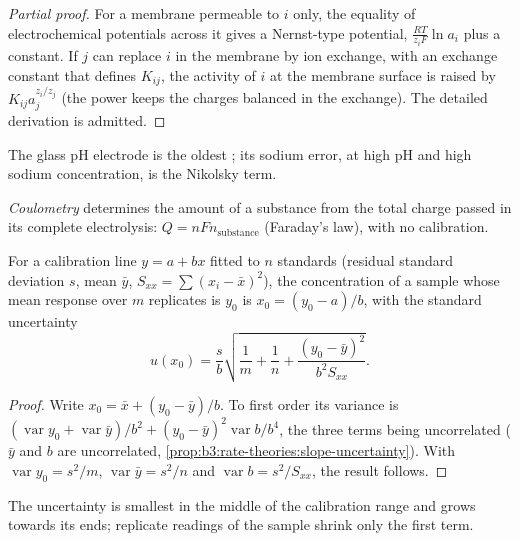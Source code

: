 \begin{proof}[Partial proof]
For a membrane permeable to $i$ only, the equality of electrochemical
potentials across it gives a Nernst-type potential, $\frac{RT}{z_iF}\ln a_i$ plus a constant.
If $j$ can replace $i$ in the membrane by ion exchange, with an exchange
constant that defines $K_{ij}$, the activity of $i$ at the membrane surface is raised by
$K_{ij}a_j^{z_i/z_j}$ (the power keeps the charges balanced in the exchange). The detailed
derivation is admitted.
\end{proof}

The glass pH electrode is the oldest ; its sodium
error, at high pH and high sodium concentration, is the Nikolsky term.

\begin{definition}[Coulometry]\label{def:b3:electrode-kinetics:coulometry}
\emph{Coulometry} determines the amount of a substance from the
total charge passed in its complete electrolysis: $Q = nFn_{\text{substance}}$ (Faraday's
law), with no calibration.
\end{definition}

\begin{proposition}\label{prop:b3:electrode-kinetics:inverse-prediction}
For a calibration line $y = a + bx$ fitted to $n$ standards (residual standard
deviation $s$, mean $\bar y$, $S_{xx} = \sum(x_i - \bar x)^2$), the concentration of a sample whose
mean response over $m$ replicates is $y_0$ is $x_0 = (y_0 - a)/b$, with the standard
uncertainty
\[
  u(x_0) = \frac{s}{b}\sqrt{\frac1m + \frac1n + \frac{(y_0 - \bar y)^2}{b^2S_{xx}}} .
\]
\end{proposition}

\begin{proof}
Write $x_0 = \bar x + (y_0 - \bar y)/b$. To first order its variance is $(\operatorname{var}y_0 +
\operatorname{var}\bar y)/b^2 + (y_0 - \bar y)^2\operatorname{var}b/b^4$, the three terms being uncorrelated ($\bar y$ and $b$
are uncorrelated, \cref{prop:b3:rate-theories:slope-uncertainty}). With $\operatorname{var}y_0 =
s^2/m$, $\operatorname{var}\bar y = s^2/n$ and $\operatorname{var}b = s^2/S_{xx}$, the result follows.
\end{proof}

The uncertainty is smallest in the middle of the calibration range and grows
towards its ends; replicate readings of the sample shrink only the first term.

